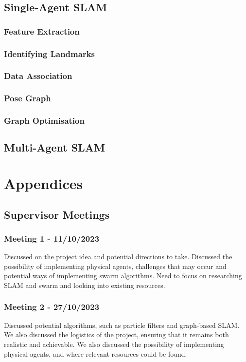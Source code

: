 \documentclass[12pt]{article}
\begin{document}
\subsection{Single-Agent SLAM}
\subsubsection{Feature Extraction}
\subsubsection{Identifying Landmarks}
\subsubsection{Data Association}
\subsubsection{Pose Graph}
\subsubsection{Graph Optimisation}


\subsection{Multi-Agent SLAM}


\section{Appendices}
\subsection{Supervisor Meetings}
\subsubsection{Meeting 1 - 11/10/2023}
Discussed on the project idea and potential directions to take. Discussed the possibility of implementing physical agents,
challenges that may occur and potential ways of implementing swarm algorithms. Need to focus on researching SLAM and swarm
and looking into existing resources.
\subsubsection{Meeting 2 - 27/10/2023}
Discussed potential algorithms, such as particle filters and graph-based SLAM. We also discussed the logistics of the project,
ensuring that it remains both realistic and achievable. We also discussed the possibility of implementing physical agents,
and where relevant resources could be found.
\end{document}
